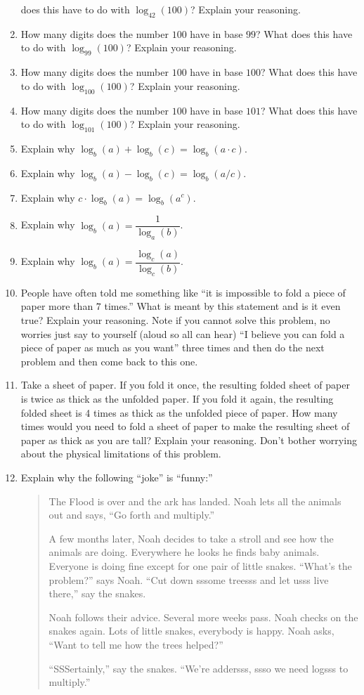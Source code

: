 \begin{problems}
\begin{enumerate}
  does this have to do with $\log_{42}(100)$? Explain your reasoning.
\item How many digits does the number $100$ have in base $99$?  What
  does this have to do with $\log_{99}(100)$? Explain your reasoning.
\item How many digits does the number $100$ have in base $100$?  What
  does this have to do with $\log_{100}(100)$? Explain your reasoning.
\item How many digits does the number $100$ have in base $101$?  What
  does this have to do with $\log_{101}(100)$? Explain your reasoning.
\item Explain why $\log_b(a) + \log_b(c) = \log_b(a\cdot c)$.
\item Explain why $\log_b(a) - \log_b(c) = \log_b(a/c)$.
\item Explain why $c\cdot\log_b(a) = \log_b(a^c)$.
\item Explain why $\log_b(a) = \dfrac{1}{\log_a(b)}$.
\item Explain why $\log_b(a) = \dfrac{\log_c(a)}{\log_c(b)}$.
\item People have often told me something like ``it is impossible to
  fold a piece of paper more than $7$ times.'' What is meant by this
  statement and is it even true? Explain your reasoning. Note if you
  cannot solve this problem, no worries just say to yourself (aloud so
  all can hear) ``I believe you can fold a piece of paper as much as
  you want'' three times and then do the next problem and then come
  back to this one.
\item Take a sheet of paper. If you fold it once, the resulting folded
  sheet of paper is twice as thick as the unfolded paper. If you fold
  it again, the resulting folded sheet is 4 times as thick as the
  unfolded piece of paper. How many times would you need to fold a
  sheet of paper to make the resulting sheet of paper as thick as you
  are tall? Explain your reasoning. Don't bother worrying about the
  physical limitations of this problem.
\item Explain why the following ``joke'' is ``funny:'' 
\begin{quote} 
The Flood is over and the ark has landed. Noah lets all the animals
out and says, ``Go forth and multiply.''

A few months later, Noah decides to take a stroll and see how the
animals are doing. Everywhere he looks he finds baby animals. Everyone
is doing fine except for one pair of little snakes. ``What's the
problem?'' says Noah.  ``Cut down sssome treesss and let usss live there,'' say
the snakes.

Noah follows their advice. Several more weeks pass. Noah checks on the
snakes again. Lots of little snakes, everybody is happy. Noah asks,
``Want to tell me how the trees helped?''

``SSSertainly,'' say the snakes. ``We're addersss, ssso we need logsss
to multiply.''
\end{quote}
\end{enumerate}
\end{problems}
